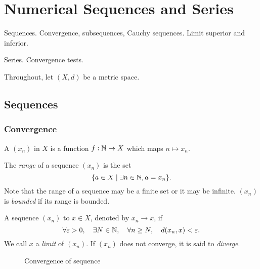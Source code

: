 \chapter{Numerical Sequences and Series}\label{chap:num-seq-series}
\begin{summary}
\item Sequences. Convergence, subsequences, Cauchy sequences. Limit superior and inferior.
\item Series. Convergence tests.
\end{summary}

Throughout, let $(X,d)$ be a metric space.

\section{Sequences}
\subsection{Convergence}
A  $(x_n)$ in $X$ is a function $f:\mathbb N\to X$ which maps $n\mapsto x_n$.

The \emph{range} of a sequence $(x_n)$ is the set
\[\{a\in X\mid\exists n\in\mathbb N, a=x_n\}.\]
Note that the range of a sequence may be a finite set or it may be infinite. $(x_n)$ is \emph{bounded} if its range is bounded.

\begin{definition}
A sequence $(x_n)$  to $x\in X$, denoted by $x_n\to x$, if
\[\forall\varepsilon>0,\quad\exists N\in\mathbb N,\quad\forall n\ge N,\quad d(x_n,x)<\varepsilon.\]
We call $x$ a \emph{limit} of $(x_n)$. 
If $(x_n)$ does not converge, it is said to \emph{diverge}.
\end{definition}

\begin{figure}[H]
\centering
{}
\caption{Convergence of sequence}
\end{figure}


